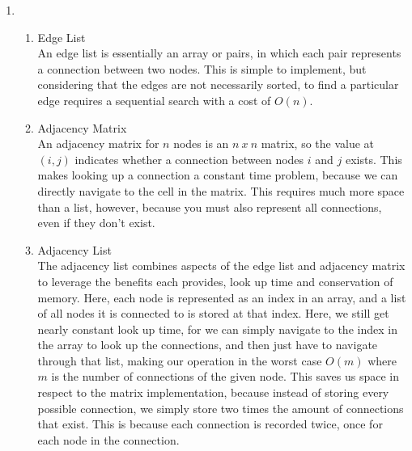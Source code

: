 \documentclass{article}
\begin{document}
\begin{enumerate}
\begin{enumerate}[label=(\alph*)]
    \end{enumerate}
\pagebreak    
\item
    \begin{enumerate}[label=(\alph*)]
        \item Edge List
        \\[\medskipamount]
            An edge list is essentially an array or pairs, in which each pair represents a connection between two nodes. This is simple to implement, but considering that the edges are not necessarily sorted, to find a particular edge requires a sequential search with a cost of \(O(n)\).
            
        \item Adjacency Matrix
        \\[\medskipamount]
            An adjacency matrix for \(n\) nodes is an \(n\:x\:n\) matrix, so the value at \((i,j)\) indicates whether a connection between nodes \(i\) and \(j\) exists. This makes looking up a connection a constant time problem, because we can directly navigate to the cell in the matrix. This requires much more space than a list, however, because you must also represent all connections, even if they don't exist.  
            
        \item Adjacency List
        \\[\medskipamount]
            The adjacency list combines aspects of the edge list and adjacency matrix to leverage the benefits each provides, look up time and conservation of memory. Here, each node is represented as an index in an array, and a list of all nodes it is connected to is stored at that index. Here, we still get nearly constant look up time, for we can simply navigate to the index in the array to look up the connections, and then just have to navigate through that list, making our operation in the worst case \(O(m)\) where \(m\) is the number of connections of the given node. This saves us space in respect to the matrix implementation, because instead of storing every possible connection, we simply store two times the amount of connections that exist. This is because each connection is recorded twice, once for each node in the connection.
            
    \end{enumerate}

\end{enumerate}
\end{document}
